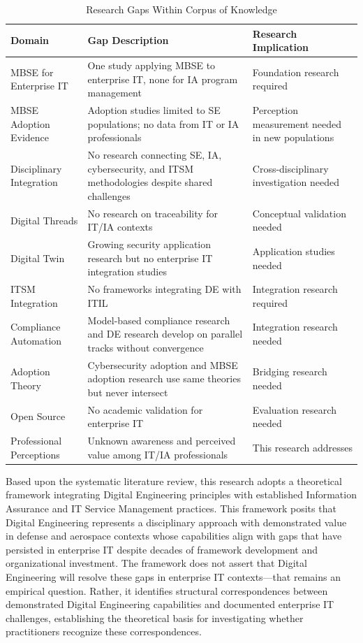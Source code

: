 \begin{table}[htbp]
  \centering
  \caption{Research Gaps Within Corpus of Knowledge}\label{tab:researchGaps}
  \small
  \begin{tabular}{@{}p{1.8in}p{2.1in}p{2.2in}@{}}
    \toprule
    \textbf{Domain} & \textbf{Gap Description} & \textbf{Research Implication} \\
    \midrule
    MBSE for Enterprise IT & One study applying MBSE to enterprise IT, none for IA program management & Foundation research required \\
    \midrule
    MBSE Adoption Evidence & Adoption studies limited to SE populations; no data from IT or IA professionals & Perception measurement needed in new populations \\
    \midrule
    Disciplinary Integration & No research connecting SE, IA, cybersecurity, and ITSM methodologies despite shared challenges & Cross-disciplinary investigation needed \\
    \midrule
    Digital Threads & No research on traceability for IT/IA contexts & Conceptual validation needed \\
    \midrule
    Digital Twin & Growing security application research but no enterprise IT integration studies & Application studies needed \\
    \midrule
    ITSM Integration & No frameworks integrating DE with ITIL & Integration research required \\
    \midrule
    Compliance Automation & Model-based compliance research and DE research develop on parallel tracks without convergence & Integration research needed \\
    \midrule
    Adoption Theory & Cybersecurity adoption and MBSE adoption research use same theories but never intersect & Bridging research needed \\
    \midrule
    Open Source & No academic validation for enterprise IT & Evaluation research needed \\
    \midrule
    Professional Perceptions & Unknown awareness and perceived value among IT/IA professionals & This research addresses \\
    \bottomrule
  \end{tabular}
\end{table}

Based upon the systematic literature review, this research adopts a theoretical framework integrating Digital Engineering principles with established Information Assurance and IT Service Management practices. This framework posits that Digital Engineering represents a disciplinary approach with demonstrated value in defense and aerospace contexts whose capabilities align with gaps that have persisted in enterprise IT despite decades of framework development and organizational investment. The framework does not assert that Digital Engineering will resolve these gaps in enterprise IT contexts---that remains an empirical question. Rather, it identifies structural correspondences between demonstrated Digital Engineering capabilities and documented enterprise IT challenges, establishing the theoretical basis for investigating whether practitioners recognize these correspondences.

